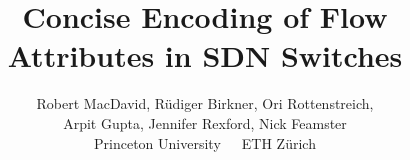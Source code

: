 \documentclass[10pt,twocolumn]{confpaper}
\date{}
\title{
{\ttlfnt Concise Encoding of Flow Attributes in SDN Switches}}
\author{
{\aufnt Robert MacDavid\ptn, R\"udiger Birkner\et, Ori Rottenstreich\ptn,}\\
{\aufnt Arpit Gupta\ptn, Jennifer Rexford\ptn, Nick Feamster\ptn}\\
\ptn\normalsize{Princeton University}~~~\et\normalsize{ETH Z\"{u}rich}\\
}
\begin{document}
\maketitle
\thispagestyle{empty}


\begin{sloppypar}












\end{sloppypar}
\balance


%
\end{document}
